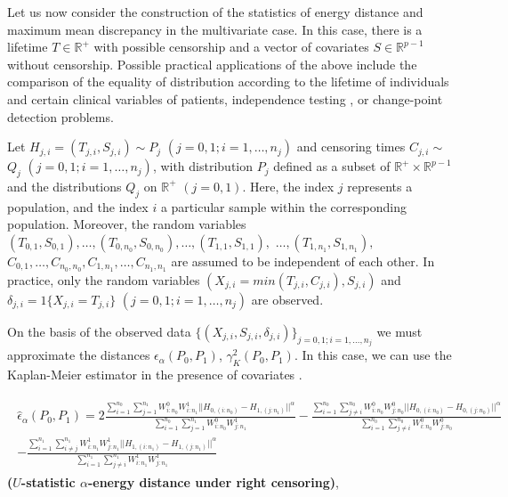 \documentclass[11pt]{article}
\begin{document}
\begin{appendices}



Let us now consider the construction of the statistics of energy distance and maximum mean discrepancy in the multivariate case. In this case, there is a  lifetime $T\in \mathbb{R}^{+}$ with possible censorship  and a vector of covariates $S\in \mathbb{R}^{p-1}$ without censorship. Possible practical applications of the above include the comparison of the equality of distribution according to the lifetime of individuals and certain clinical variables of patients, independence testing \cite{shen2019exact},  or change-point detection problems.

Let $H_{j,i}=(T_{j,i},S_{j,i}) \sim P_j$ $(j=0,1; i=1,\dots,n_j)$ and censoring times $C_{j,i} \sim$ $Q_j$ $(j=0,1; i=1,\dots,n_j)$, with distribution   $P_j$  defined as a subset of $\mathbb{R^{+}}\times \mathbb{R}^{p-1}$ and the distributions  $Q_j$ on $\mathbb{R}^{+}$ $(j=0,1)$. Here,  the index   $j$  represents  a population, and the index  $i$  a particular  sample within the corresponding  population. Moreover, the random variables  $(T_{0,1},S_{0,1}),\dots,(T_{0,n_0},S_{0,n_0}),\dots,(T_{1,1},S_{1,1}),$ $\dots,(T_{1,n_1},S_{1,n_1}),$ $ C_{0,1},\dots,C_{n_0,n_0},C_{1,n_1},\dots,C_{n_1,n_1}$ are assumed to be independent of each other. In practice, only the random variables   $(X_{j,i}= min(T_{j,i},C_{j,i}),S_{j,i})$  and $\delta_{j,i}= 1\{X_{j,i} = T_{j,i}\}$	$(j=0,1; i=1,\dots,n_j)$ are observed. %

On the basis  of the  observed  data $\{(X_{j,i},S_{j,i},\delta_{j,i})\}_{j=0,1; i=1,\dots,n_j}$ we must approximate the distances $\epsilon_\alpha(P_0,P_1)$, ${\gamma}_K^{2}(P_0,P_1)$. In this case, we can use the Kaplan-Meier estimator in the presence of covariates \cite{stute1993consistent,gerds2017kaplan}.


\begin{gather*}
\begin{align}
\hat{\epsilon}_{\alpha}(P_0,P_1)= 2  \frac{\sum_{i=1}^{n_0}  \sum_{j=1}^{n_1} W^{0}_{i:n_0} W^{1}_{i:n_1} ||H_{0,(i:n_0)}-H_{1,(j:n_1)}||^{\alpha}}{\sum_{i=1}^{n_0}  \sum_{j=1}^{n_1} W^{0}_{i:n_0} W^{1}_{j:n_1}} - \frac{\sum_{i=1}^{n_0} \sum_{j\neq i}^{n_0}  W^{0}_{i:n_0} W^{0}_{j:n_0}  ||H_{0,(i:n_0)}-H_{0,(j:n_0)}||^{\alpha}}{\sum_{i=1}^{n_0} \sum_{j\neq i}^{n_0} W^{0}_{i:n_0} W^{0}_{j:n_0}} \\
- \frac{\sum_{i=1}^{n_1}  \sum_{i\neq j}^{n_1} W^{1}_{i:n_1} W^{1}_{j:n_1}  ||H_{1,(i:n_1)}-H_{1,(j:n_1)}||^{\alpha}}{\sum_{i=1}^{n_1}  \sum_{j\neq i}^{n_1} W^{1}_{i:n_1} W^{1}_{j:n_1}} \nonumber
\end{align}
\end{gather*}
\textbf{($U$-statistic $\alpha$-energy distance under right censoring)},


\end{appendices}
\end{document}
